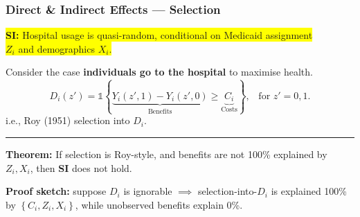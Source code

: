 \documentclass[dvipsnames]{beamer} %
\renewcommand{\vec}[1]{\boldsymbol{\mathit{#1}}}                           %
\newcommand{\indicator}[1]{\mathds{1}\left\{ #1 \right\}}                  %
\begin{document}
\begin{frame}[noframenumbering]
    \frametitle{Direct \& Indirect Effects --- Selection} 
    \colorbox{yellow}{\textbf{SI:}
        Hospital usage is quasi-random, conditional on Medicaid assignment} \\
    \colorbox{yellow}{$Z_i$ and demographics $\vec X_i$.}

    \vskip0.25cm
    Consider the case \textbf{individuals go to the hospital} to maximise health.
    \[ D_i \left( z' \right) = \indicator{
        \underbrace{Y_i\left( z', 1 \right) - Y_i\left( z', 0 \right)}_{\text{Benefits}}
        \geq \underbrace{C_i}_{\text{Costs}}}, \;\;\; \text{for } z'=0,1.
    \]
    i.e., Roy (1951) selection into $D_i$.
    \par\noindent\rule{\textwidth}{0.4pt}
    \pause
    \vfill
    \textbf{Theorem:}
    If selection is Roy-style, and benefits are not 100\% explained by $Z_i, \vec X_i$, then \textbf{SI} does not hold.

    \vskip0.125cm
    \textbf{Proof sketch:} suppose $D_i$ is ignorable $\implies$ selection-into-$D_i$ is explained 100\% by $\left\{ C_i, Z_i, \vec X_i \right\}$, while unobserved benefits explain 0\%.
\end{frame}
\end{document}
